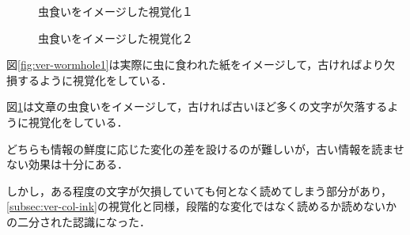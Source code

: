 \begin{figure}[htbp]
  \begin{minipage}{0.5\hsize}
    \begin{center}
    \end{center}
    \caption{虫食いをイメージした視覚化１}
    \label{fig:ver-wormhole1}
  \end{minipage}
  \begin{minipage}{0.5\hsize}
    \begin{center}
    \end{center}
    \caption{虫食いをイメージした視覚化２}
    \label{fig:ver-wormhole2}
  \end{minipage}
\end{figure}

図\ref{fig:ver-wormhole1}は実際に虫に食われた紙をイメージして，古ければより欠損するように視覚化をしている．

図\ref{fig:ver-wormhole2}は文章の虫食いをイメージして，古ければ古いほど多くの文字が欠落するように視覚化をしている．

どちらも情報の鮮度に応じた変化の差を設けるのが難しいが，古い情報を読ませない効果は十分にある．

しかし，ある程度の文字が欠損していても何となく読めてしまう部分があり，\ref{subsec:ver-col-ink}の視覚化と同様，段階的な変化ではなく読めるか読めないかの二分された認識になった．

